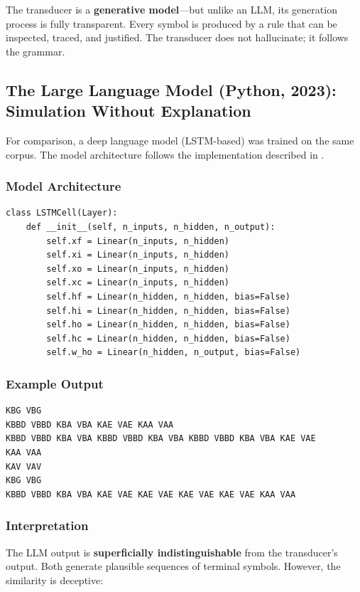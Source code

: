 \documentclass[12pt,a4paper]{article}
\begin{document}
The transducer is a \textbf{generative model}—but unlike an LLM, its generation 
process is fully transparent. Every symbol is produced by a rule that can be 
inspected, traced, and justified. The transducer does not hallucinate; it 
follows the grammar.

\subsection{The Large Language Model (Python, 2023): Simulation Without Explanation}

For comparison, a deep language model (LSTM-based) was trained on the same 
corpus. The model architecture follows the implementation described in 
\citet{trask2020neural}.

\subsubsection{Model Architecture}

\begin{lstlisting}[caption=LSTM Language Model in Python]
class LSTMCell(Layer):
    def __init__(self, n_inputs, n_hidden, n_output):
        self.xf = Linear(n_inputs, n_hidden)
        self.xi = Linear(n_inputs, n_hidden)
        self.xo = Linear(n_inputs, n_hidden)
        self.xc = Linear(n_inputs, n_hidden)
        self.hf = Linear(n_hidden, n_hidden, bias=False)
        self.hi = Linear(n_hidden, n_hidden, bias=False)
        self.ho = Linear(n_hidden, n_hidden, bias=False)
        self.hc = Linear(n_hidden, n_hidden, bias=False)
        self.w_ho = Linear(n_hidden, n_output, bias=False)
\end{lstlisting}

\subsubsection{Example Output}

\begin{verbatim}
KBG VBG 
KBBD VBBD KBA VBA KAE VAE KAA VAA 
KBBD VBBD KBA VBA KBBD VBBD KBA VBA KBBD VBBD KBA VBA KAE VAE 
KAA VAA 
KAV VAV 
KBG VBG 
KBBD VBBD KBA VBA KAE VAE KAE VAE KAE VAE KAE VAE KAA VAA 
\end{verbatim}

\subsubsection{Interpretation}

The LLM output is \textbf{superficially indistinguishable} from the transducer's 
output. Both generate plausible sequences of terminal symbols. However, the 
similarity is deceptive:
\end{document}
